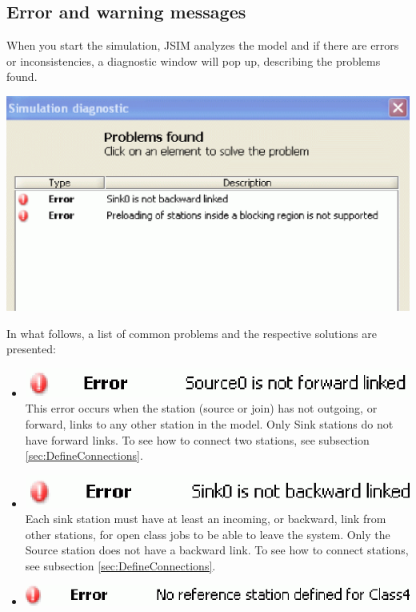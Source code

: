 \begin{description*}
\section{Error and warning messages}
\label{sec:ErrorAndWarningMessages} When you start the simulation,
JSIM analyzes the model and if there are errors or
inconsistencies, a diagnostic window will pop up, describing the
problems found.
\begin{center}
\includegraphics[scale=.5]{img/jsim/error_window.eps}
\end{center}
In what follows, a list of common problems and the respective solutions are presented:
\begin{itemize}
\item \includegraphics[scale=.5]{img/jsim/1.eps}\\
This error occurs when the station (source or join) has not outgoing, or forward, links to any other station in the model. Only Sink stations do not have forward links.
To see how to connect two stations, see subsection \ref{sec:DefineConnections}.
\item \includegraphics[scale=.5]{img/jsim/2.eps}\\
Each sink station must have at least an incoming, or backward, link from other stations, for open class jobs to be able to leave the system. Only the Source station does not have a backward link. To see how to connect stations, see subsection \ref{sec:DefineConnections}.
\item \includegraphics[scale=.5]{img/jsim/3.eps}\\

\end{itemize}
\end{description*}
